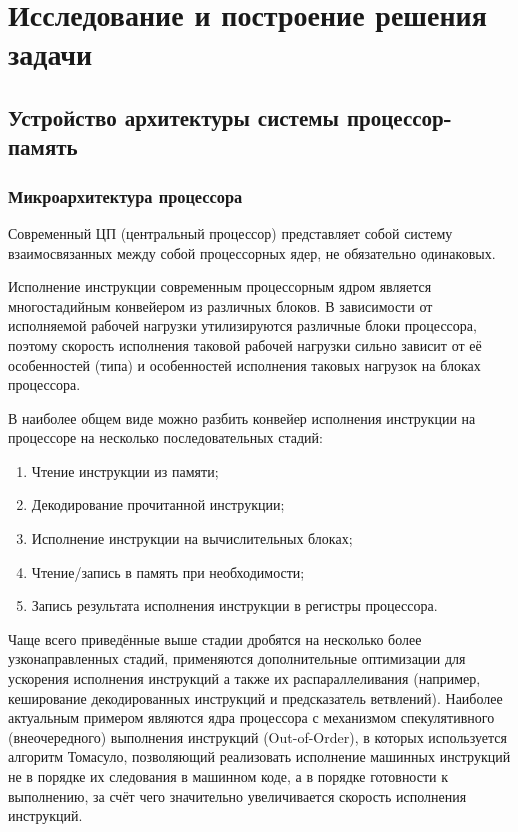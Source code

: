 \section{Исследование и построение решения задачи}
\label{sec:Section3} 

\subsection{Устройство архитектуры системы процессор-память}

\subsubsection{Микроархитектура процессора}

    Современный ЦП (центральный процессор) представляет собой
    систему взаимосвязанных между собой процессорных ядер, не обязательно одинаковых.

    Исполнение инструкции современным процессорным ядром является многостадийным конвейером
    из различных блоков. В зависимости от исполняемой рабочей нагрузки утилизируются различные блоки
    процессора, поэтому скорость исполнения таковой рабочей нагрузки сильно зависит
    от её особенностей (типа) и особенностей исполнения таковых нагрузок на блоках процессора.

    В наиболее общем виде можно разбить конвейер исполнения инструкции на процессоре на несколько
    последовательных стадий:
    \begin{enumerate}
        \item Чтение инструкции из памяти;
        \item Декодирование прочитанной инструкции;
        \item Исполнение инструкции на вычислительных блоках;
        \item Чтение/запись в память при необходимости;
        \item Запись результата исполнения инструкции в регистры процессора.
    \end{enumerate}

    Чаще всего приведённые выше стадии дробятся на несколько более узконаправленных стадий, применяются
    дополнительные оптимизации для ускорения исполнения инструкций а также их распараллеливания
    (например, кеширование декодированных инструкций и предсказатель ветвлений). Наиболее
    актуальным примером являются ядра процессора с механизмом спекулятивного (внеочередного) выполнения
    инструкций (Out-of-Order), в которых используется алгоритм Томасуло, позволяющий реализовать
    исполнение машинных инструкций не в порядке их следования в машинном коде, а в порядке
    готовности к выполнению, за счёт чего значительно увеличивается скорость исполнения инструкций.

